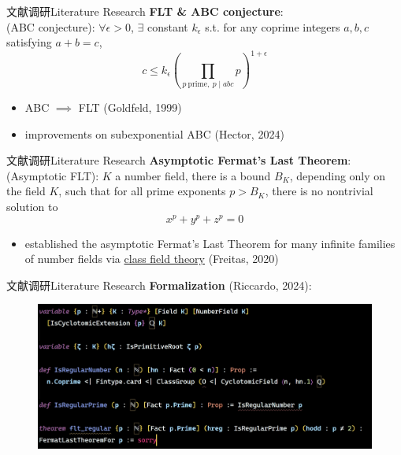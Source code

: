 \documentclass[aspectratio=169]{beamer}
\begin{document}
    \begin{frame}{文献调研}{Literature Research}
    \textbf{FLT \& ABC conjecture}:\\
    \vspace{10pt}
    (ABC conjecture): $\forall \epsilon > 0$, $\exists$ constant $k_\epsilon$ s.t. for any coprime integers $a, b, c$ satisfying $a+b=c$,
    $$
    c \leq k_\epsilon \left(\prod_{p \ \text{prime}, \ p \mid abc} p\right)^{1+\epsilon}
    $$
    \begin{itemize}
    \item ABC $\implies$ FLT (Goldfeld, 1999)
    \item improvements on subexponential ABC (Hector, 2024)
    \end{itemize}
    \end{frame}
    
    \begin{frame}{文献调研}{Literature Research}
    \textbf{Asymptotic Fermat's Last Theorem}:\\
    \vspace{10pt}
    (Asymptotic FLT): $K$ a number field, there is a bound $B_K$, depending only on the field $K$, such that for all prime exponents $p > B_K$, there is no nontrivial solution to
    $$x^p + y^p + z^p = 0$$
    \begin{itemize}
    \item established the asymptotic Fermat's Last Theorem for many infinite families of number fields via \underline{class field theory} (Freitas, 2020)
    \end{itemize}
    \end{frame}
    
    \begin{frame}[fragile]{文献调研}{Literature Research}
    \textbf{Formalization} (Riccardo, 2024):\\
    \begin{figure}
 		\centering
 		\includegraphics[width=0.8\linewidth]{screenshot.png}
	\end{figure}
    \end{frame}
	
\end{document}
